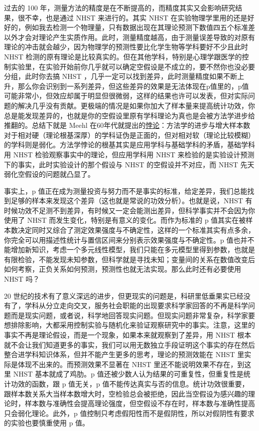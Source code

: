 \documentclass[]{tufte-book}
\begin{document}
过去的 100 年，测量方法的精度是在不断提高的，而精度其实又会影响研究结果，很不幸，也是通过 NHST 来进行的。其实 NHST 在实验物理学里用的还是好好的，例如我去检测一个物理量，只有数据出现在其理论预测下数值四五个标准差以外才会对理论产生实质作用。此时，测量精度越高，由于测量误差导致的对原有理论的冲击就会越少，因为物理学的预测性要比化学生物等学科要好不少且此时 NHST 检测的原有理论是比较真实的。但在其他学科，特别是心理学跟医学的控制实验里，在实验开始前你几乎就可以确定空假设是不成立的，要不然你也没必要分组，此时你去搞 NHST ，几乎一定可以找到差异，此时测量精度如果不断上升，那么你会识别到一系列差异，但这些差异的效果是无法体现在p值里的，p值可能非常小，但效应却属于明显但很微弱，这样的结果也许可以发表，但对实际问题的解决几乎没有贡献。更极端的情况是如果你加大了样本量来提高统计功效，你总是能发现差异的，也就是你的空假设里原有学科理论为真也是会被方法学进步给推翻的。总结下就是 Meehl 在60年代就提出的\href{https://philpapers.org/rec/MEETIP}{悖论}：方法学的进步与增大样本数对于相对硬（理论根基深厚）的学科证伪是正面的，但对相对软（理论比较模糊）的学科则是弱化。方法学悖论的根基其实是应用学科与基础学科的矛盾，基础学科用 NHST 检验观察事实中的理论，但应用学科用 NHST 来检验的是实验设计预测下的事实，此时实验设计的那个假设与 NHST 的空假设并不对应，而 NHST 先天弱化空假设的问题就凸显了。

事实上，p 值正在成为测量投资与努力而不是事实的标准，给定差异，我们总能找到足够的样本来发现这个差异（这也就是常说的功效分析）。也就是说，NHST 有时候功效不足测不到差异，有时候又一定会能测出差异，但科学事实并不会因为你使用了 NHST 而发生变化，特别是有意义的变化。而作为标准的 p 值其实在被样本数决定同时又综合了测定效果强度与不确定性，这样的一个标准其实有点多余，你完全可以用描述性统计与置信区间来分别表示效果强度与不确定性。p 值也并不能增加新知识，考虑一个多元线性模型，我们只能在多元模型里得到参数，也就是有限检验，不能发现未知参数，但科学就是寻找未知；变量间的关系在数值改变后如何考察，正负关系如何预测，预测性也就无法实现。那么此时还有必要使用 NHST 吗？

20 世纪的技术有了意义深远的进步，但更现实的问题是，科研里低垂果实已经没有了，学科从分立走向交叉，服务社会职能的出现要求科学家回答的不再是科学问题而是现实问题，或者说，科学地回答现实问题。但现实问题非常复杂，科学家要想排除影响，大都采用控制实验与随机化来验证观察研究中的事实。注意，这里的事实不再是理论假设，而是一个现象，如果本来就观察到了差异，用 NHST 根本就不会让我们知道更多的事实，我们可以用无数独立手段证明这个事实的存在然后整合进学科知识体系，但并不能产生更多的思考，理论的预测效能在 NHST 里实际是体现不出来的。而预测效果不显著在 NHST 里还不能说明效果不存在，到这里 NHST 基本就成了鸡肋。p 值还被少数人认为结果的可重复性，但重复性是统计功效的函数，跟 p 值无关，p 值不能传达真实与否的信息。统计功效很重要，跟样本数关系大当样本数增大时，空检验总会被拒绝，因此当空假设为感兴趣的理论时，样本数与准确性会提高理论强度，但空假设不存在时，样本数与准确性提高只会弱化理论。此外，p 值控制只考虑假阳性而不是假阴性，所以对假阴性有要求的实验也要慎重使用 p 值。
\end{document}
